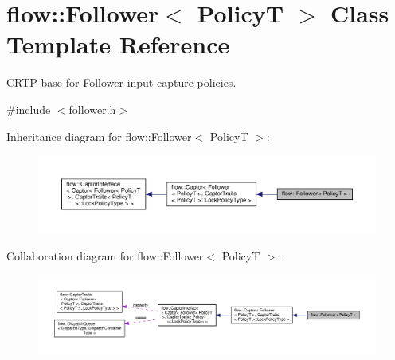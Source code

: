 \hypertarget{classflow_1_1_follower}{}\section{flow\+:\+:Follower$<$ PolicyT $>$ Class Template Reference}
\label{classflow_1_1_follower}


C\+R\+T\+P-\/base for \hyperlink{classflow_1_1_follower}{Follower} input-\/capture policies.  




{\ttfamily \#include $<$follower.\+h$>$}



Inheritance diagram for flow\+:\+:Follower$<$ PolicyT $>$\+:\nopagebreak
\begin{figure}[H]
\begin{center}
\leavevmode
\includegraphics[width=350pt]{classflow_1_1_follower__inherit__graph}
\end{center}
\end{figure}


Collaboration diagram for flow\+:\+:Follower$<$ PolicyT $>$\+:\nopagebreak
\begin{figure}[H]
\begin{center}
\leavevmode
\includegraphics[width=350pt]{classflow_1_1_follower__coll__graph}
\end{center}
\end{figure}
